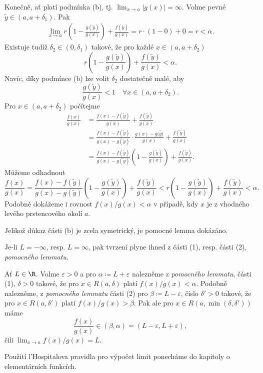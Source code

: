 \begin{lemproof}
 Konečně, ať platí podmínka (b), tj. $\lim_{x \to a} |g(x)| = \infty$. Volme
 pevné $\tilde{y} \in (a,a+\delta_1)$. Pak
 \begin{align*}
  \lim_{x \to a} r \left( 1 - \frac{g(\tilde{y})}{g(x)} \right) +
  \frac{f(\tilde{y})}{g(x)} = r \cdot (1 - 0) + 0 = r < \alpha.
 \end{align*}
 Existuje tudíž $\delta_2 \in (0,\delta_1)$ takové, že pro každé $x \in
 (a,a+\delta_2)$
 \[
  r \left( 1 - \frac{g(\tilde{y})}{g(x)} \right) + \frac{f(\tilde{y})}{g(x)} <
  \alpha.
 \]
 Navíc, díky podmínce (b) lze volit $\delta_2$ dostatečně malé, aby
 \[
  \frac{g(\tilde{y})}{g(x)} < 1 \quad \forall x \in (a,a+\delta_2).
 \]
 Pro $x \in (a,a+\delta_2)$ počítejme
 \begin{align*}
  \frac{f(x)}{g(x)} &= \frac{f(x) - f(\tilde{y})}{g(x)} +
  \frac{f(\tilde{y})}{g(x)}\\
                    &= \frac{f(x) - f(\tilde{y})}{g(x) - g(\tilde{y})} \cdot
                    \frac{g(x) - g(\tilde{y)}}{g(x)} +
                    \frac{f(\tilde{y})}{g(x)}\\
                    &= \frac{f(x) - f(\tilde{y})}{g(x) - g(\tilde{y})} \left( 1
                    - \frac{g(\tilde{y})}{g(x)}\right) +
                    \frac{f(\tilde{y})}{g(x)}.
 \end{align*}
 Můžeme odhadnout
 \[
  \frac{f(x)}{g(x)} = \frac{f(x) - f(\tilde{y})}{g(x) - g(\tilde{y})} \left( 1 -
  \frac{g(\tilde{y})}{g(x)}\right) + \frac{f(\tilde{y})}{g(x)} < r \left( 1 -
 \frac{g(\tilde{y})}{g(x)} \right) + \frac{f(\tilde{y})}{g(x)} < \alpha.
 \]
 Podobně dokážeme i rovnost $f(x) / g(x) < \alpha$ v případě, kdy $x$ je z
 vhodného levého prstencového okolí $a$.

Jelikož důkaz části (b) je zcela symetrický, je pomocné lemma dokázáno. 
\end{lemproof}

\begin{thmproof}
 Je-li $L = -\infty$, resp. $L = \infty$, pak tvrzení plyne ihned z části (1),
 resp. části (2), \emph{pomocného lemmatu}.

 Ať $L \in \R$. Volme $\varepsilon>0$ a pro $\alpha \coloneqq L+\varepsilon$
 nalezněme z \emph{pomocného lemmatu}, části (1), $\delta>0$ takové, že pro $x
 \in R(a,\delta)$ platí $f(x) / g(x) < \alpha$. Podobně nalezněme, z
 \emph{pomocného lemmatu} části (2) pro $\beta \coloneqq L-\varepsilon$, číslo
 $\delta'>0$ takové, že pro $x \in R(a,\delta')$ platí $f(x) / g(x) > \beta$.
 Pak ale pro $x \in R(a,\min(\delta,\delta'))$ máme
 \[
  \frac{f(x)}{g(x)} \in (\beta,\alpha) = (L-\varepsilon,L+\varepsilon),
 \]
 čili $\lim_{x \to a} f(x) / g(x) = L$.
\end{thmproof}

Použití l'Hospitalova pravidla pro výpočet limit ponecháme do kapitoly o
elementárních funkcích.

